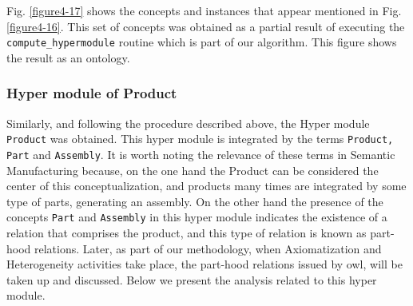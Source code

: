 Fig. \ref{figure4-17} shows the concepts and instances that appear mentioned in Fig. \ref{figure4-16}. This set of concepts was obtained as a partial result of executing the \texttt{compute\_hypermodule} routine which is part of our algorithm. This figure shows the result as an ontology. 

\subsubsection{Hyper module of Product}\label{subsubsection4.2.5.2}

Similarly, and following the procedure described above, the Hyper module \texttt{Product} was obtained. This hyper module is integrated   by the terms \texttt{Product, Part} and \texttt{Assembly}. It is worth noting the relevance of these terms in Semantic Manufacturing because,   on the one hand the Product can be considered the center of this conceptualization, and products many times are integrated by some type of parts, generating an assembly. On the other hand the presence of the concepts \texttt{Part} and \texttt{Assembly} in this hyper module indicates the existence of a relation that comprises the product, and this type of relation is known as part-hood relations. Later, as part of our methodology, when Axiomatization and Heterogeneity activities take place, the part-hood relations issued by \gls{owl}, will be taken up and discussed. Below we present the analysis related to this hyper module. 

